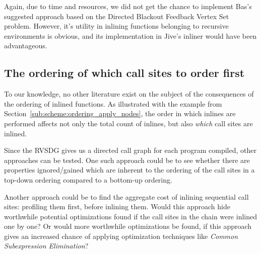 Again, due to time and resources, we did not get the chance to implement Bas's
suggested approach based on the Directed Blackout Feedback Vertex Set problem.
However, it's utility in inlining functions belonging to recursive environments
is obvious, and its implementation in Jive's inliner would have been
advantageous.

\subsection{The ordering of which call sites to order first}
\label{sub:fw:call_site_visit_order}

To our knowledge, no other literature exist on the subject of the consequences
of the ordering of inlined functions. As illustrated with the example from
Section~\ref{sub:scheme:ordering_apply_nodes}, the order in which inlines are
performed affects not only the total count of inlines, but also \textit{which}
call sites are inlined.

Since the RVSDG gives us a directed call graph for each program compiled, other
approaches can be tested. One such approach could be to see whether there are
properties ignored/gained which are inherent to the ordering of the call sites
in a top-down ordering compared to a bottom-up ordering.

Another approach could be to find the aggregate cost of inlining sequential call
sites: profiling them first, before inlining them. Would this approach hide
worthwhile potential optimizations found if the call sites in the chain were
inlined one by one? Or would more worthwhile optimizations be found, if this
approach gives an increased chance of applying optimization techniques like
\textit{Common Subexpression Elimination}?
